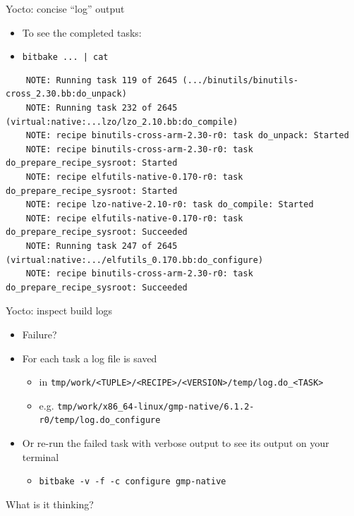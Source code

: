 \documentclass[xetex,table,aspectratio=169]{beamer}
\newcommand{\bg}[1]{
  \usebackgroundtemplate{
    \texttt{[image: images/bg-\#1.png]}
  }
}
\begin{document}
\begin{frame}[fragile]{Yocto: concise ``log'' output}
  \begin{itemize}
  \item To see the completed tasks:
  \item {\tt bitbake ... | cat}
  \end{itemize}
  \begin{verbatim}
    NOTE: Running task 119 of 2645 (.../binutils/binutils-cross_2.30.bb:do_unpack)
    NOTE: Running task 232 of 2645 (virtual:native:...lzo/lzo_2.10.bb:do_compile)
    NOTE: recipe binutils-cross-arm-2.30-r0: task do_unpack: Started
    NOTE: recipe binutils-cross-arm-2.30-r0: task do_prepare_recipe_sysroot: Started
    NOTE: recipe elfutils-native-0.170-r0: task do_prepare_recipe_sysroot: Started
    NOTE: recipe lzo-native-2.10-r0: task do_compile: Started
    NOTE: recipe elfutils-native-0.170-r0: task do_prepare_recipe_sysroot: Succeeded
    NOTE: Running task 247 of 2645 (virtual:native:.../elfutils_0.170.bb:do_configure)
    NOTE: recipe binutils-cross-arm-2.30-r0: task do_prepare_recipe_sysroot: Succeeded
  \end{verbatim}
\end{frame}

\begin{frame}{Yocto: inspect build logs}
  \begin{itemize}
  \item Failure?
  \item For each task a log file is saved
    \begin{itemize}
    \item in {\tt tmp/work/<TUPLE>/<RECIPE>/<VERSION>/temp/log.do\_<TASK>}
    \item e.g. {\tt tmp/work/x86\_64-linux/gmp-native/6.1.2-r0/temp/log.do\_configure}
    \end{itemize}
  \item Or re-run the failed task with verbose output to see its
    output on your terminal
    \begin{itemize}
    \item {\tt bitbake -v -f -c configure gmp-native}
    \end{itemize}
  \end{itemize}
\end{frame}

\bg{standout}
\begin{frame}[standout]
  What is it thinking?
\end{frame}
\end{document}
